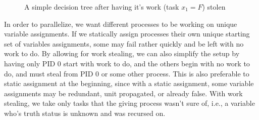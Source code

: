 \documentclass{article}
\begin{document}
\begin{figure}
    \begin{center}
    \end{center}
    \caption{A simple decision tree after having it's work (task $x_1 = F$) stolen}
    \label{fig:dec-tree2}
\end{figure}

In order to parallelize, we want different processes to be working on unique variable assignments. If we statically assign processes their own unique starting set of variables assignments, some may fail rather quickly and be left with no work to do. By allowing for work stealing, we can also simplify the setup by having only PID 0 start with work to do, and the others begin with no work to do, and must steal from PID 0 or some other process. This is also preferable to static assignment at the beginning, since with a static assignment, some variable assignments may be redundant, unit propagated, or already false. With work stealing, we take only tasks that the giving process wasn't sure of, i.e., a variable who's truth status is unknown and was recursed on.
\end{document}
